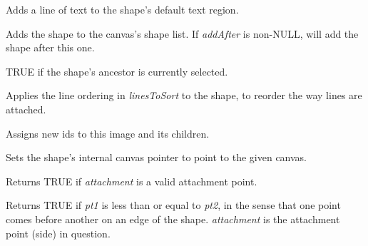 

Adds a line of text to the shape's default text region.



Adds the shape to the canvas's shape list. If {\it addAfter} is
non-NULL, will add the shape after this one.



TRUE if the shape's ancestor is currently selected.

\label{wxshapeapplyattachmentordering}


Applies the line ordering in {\it linesToSort} to the shape, to reorder the way lines are attached.



Assigns new ids to this image and its children.

\label{wxshapeattach}


Sets the shape's internal canvas pointer to point to the given canvas.

\label{wxshapeattachmentisvalid}


Returns TRUE if {\it attachment} is a valid attachment point.

\label{wxshapeattachmentsorttest}


Returns TRUE if {\it pt1} is less than or equal to {\it pt2}, in the sense
that one point comes before another on an edge of the shape. {\it attachment} is
the attachment point (side) in question.

